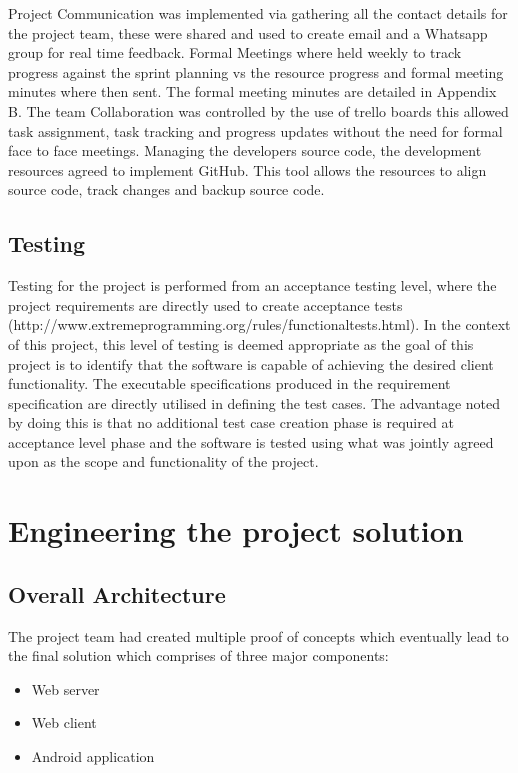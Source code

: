 \documentclass[12pt]{witseiepaper}
\begin{document}
Project Communication was implemented via gathering all the contact details for the project team, these were shared and used to create email and a Whatsapp group for real time feedback. Formal Meetings where held weekly to track progress against the sprint planning vs the resource progress and formal meeting minutes where then sent. The formal meeting minutes are detailed in Appendix B. The team Collaboration was controlled by the use of trello boards \cite{Trello} this allowed task assignment, task tracking and progress updates without the need for formal face to face meetings. Managing the developers source code, the development resources agreed to implement GitHub.\cite{GitHubRef} This tool allows the resources to align source code, track changes and backup source code. 

\subsection{Testing}
Testing for the project is performed from an acceptance testing level, where the project requirements are directly used to create acceptance tests (http://www.extremeprogramming.org/rules/functionaltests.html). In the context of this project, this level of testing is deemed appropriate as the goal of this project is to identify that the software is capable of achieving the desired client functionality.
The executable specifications produced in the requirement specification are directly utilised in defining the test cases. The advantage noted by doing this is that no additional test case creation phase is required at acceptance level phase and the software is tested using what was jointly agreed upon as the scope and functionality of the project.





\section{Engineering the project solution}
\subsection{Overall Architecture}
The project team had created multiple proof of concepts which eventually lead to the final solution which comprises of three major components:
\begin{itemize}
\item Web server 
\item Web client
\item Android application
\end{itemize}
\end{document}
